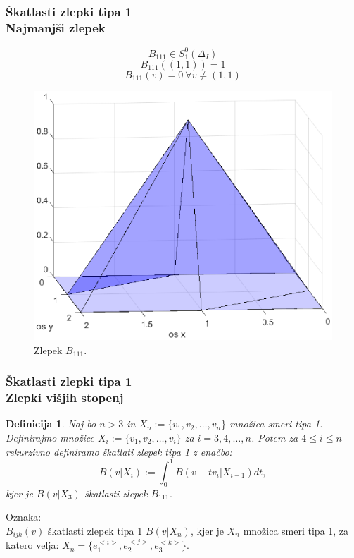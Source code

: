 \documentclass{beamer}
\newtheorem{definicija}{Definicija}
\begin{document}

\begin{frame}
\frametitle{Škatlasti zlepki tipa 1 \\ Najmanjši zlepek}

$$B_{111} \in S_1^0(\Delta_I)$$
$$B_{111} ((1,1)) = 1$$
$$B_{111} (v) = 0\ \forall v \neq (1,1)$$

\begin{figure}
    \centering
    \includegraphics[scale=0.23]{B111}
    \caption{Zlepek $B_{111}$.}
\end{figure}
\end{frame}


\begin{frame}
\frametitle{Škatlasti zlepki tipa 1 \\ Zlepki višjih stopenj}

\begin{definicija}
Naj bo $n > 3$ in $X_n := \{v_1, v_2, \ldots , v_n\}$ množica smeri tipa 1.
Definirajmo množice $X_i := \{v_1, v_2, \ldots , v_i\}$ za $i = 3, 4, \ldots, n$.
Potem za $4 \leq i \leq n$ rekurzivno definiramo škatlati zlepek tipa 1  z enačbo:
$$B(v|X_i) := \int_0^1 B(v-tv_i | X_{i-1}) dt,$$
kjer je $B(v|X_3)$ škatlasti zlepek $B_{111}$.
\end{definicija}

\vspace{5mm}

Oznaka: \\
\textbf{$B_{ijk}(v)$} škatlasti zlepek tipa 1 $B(v|X_n)$, kjer je $X_n$ množica smeri tipa 1, za katero velja: $X_n = \{e_1^{<i>},e_2^{<j>}, e_3^{<k>}\}$.

\end{frame}
\end{document}
